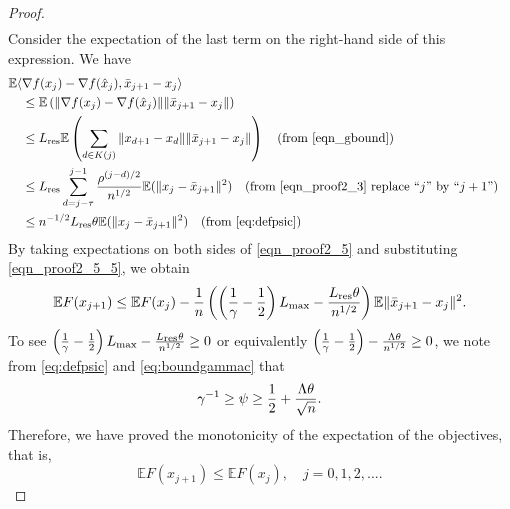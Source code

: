 \documentclass{siamltex}
\begin{document}
\begin{proof}
\begin{align}
\label{eqn_proof2_5}
\end{align}
Consider the expectation of the last term on the right-hand side of
this expression. We have
\begin{alignat}{2}
\nonumber
{\mathbb{E}} \langle & \nabla f(x_j)- \nabla f({\hat{x}}_{j}), \bar{x}_{j+1}-x_j\rangle && \\
\nonumber
& \leq {\mathbb{E}} \left( \| \nabla f(x_j)- \nabla f({\hat{x}}_{j})\| \|\bar{x}_{j+1}-x_j \| \right) && \\
\nonumber
&\leq {L_{\mbox{\rm\scriptsize res}}} {\mathbb{E}} \left( \sum_{d\in K(j)}\|x_{d+1}-x_d\|\|\bar{x}_{j+1}-x_j\|\right) \quad (\text{from \eqref{eqn_gbound}}) \\
\nonumber
&\leq {L_{\mbox{\rm\scriptsize res}}}\sum_{d=j-\tau}^{j-1}{\rho^{(j-d)/2}\over n^{1/2}}{\mathbb{E}} (\|x_{j} - \bar{x}_{j+1}\|^2) \quad (\text{from \eqref{eqn_proof2_3} replace ``$j$'' by ``$j+1$''})\\
&\leq n^{-1/2}{L_{\mbox{\rm\scriptsize res}}} \theta {\mathbb{E}}(\|x_j-\bar{x}_{j+1}\|^2) \quad (\text{from \eqref{eq:defpsic}})
\label{eqn_proof2_5_5}
\end{alignat}
By taking expectations on both sides of \eqref{eqn_proof2_5} and
substituting \eqref{eqn_proof2_5_5}, we obtain
\[
{\mathbb{E}} F(x_{j+1}) \leq {\mathbb{E}} F(x_j) - {1\over n}\left(\left({\frac{1}{\gamma}-\frac{1}{2}}\right){L_{\mbox{\rm\scriptsize max}}}-{{L_{\mbox{\rm\scriptsize res}}} \theta\over n^{1/2}}\right){\mathbb{E}}\|\bar{x}_{j+1}-x_j\|^2.
\]
To see $\left({\frac{1}{\gamma}-\frac{1}{2}}\right){L_{\mbox{\rm\scriptsize max}}}-{{L_{\mbox{\rm\scriptsize res}}}
  \theta\over n^{1/2}}\geq 0$ or equivalently
$\left({\frac{1}{\gamma}-\frac{1}{2}}\right)-{\Lambda \theta\over
  n^{1/2}}\geq 0$, we note from \eqref{eq:defpsic} and
\eqref{eq:boundgammac} that
\begin{align*}
\gamma^{-1} \geq \psi \geq {1\over 2} + \frac{\Lambda \theta}{\sqrt{n}}.
\end{align*}
Therefore, we have proved the monotonicity of the expectation of the
objectives, that is,
\begin{equation} \label{eq:monF}
{\mathbb{E}} F(x_{j+1}) \leq {\mathbb{E}}  F(x_{j}),\quad j=0,1,2,\dotsc.
\end{equation} 


\end{proof}
\end{document}
